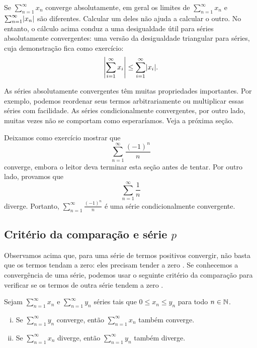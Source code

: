 Se $\sum_{n=1}^\infty x_n$ converge absolutamente, em geral os limites de
$\sum_{n=1}^\infty x_n$ e $\sum_{n=1}^\infty \lvert {x_n} \rvert$ são diferentes. Calcular um
deles não ajuda a calcular o outro. No entanto, o cálculo acima conduz a
uma desigualdade útil para séries absolutamente convergentes:
uma versão da desigualdade triangular para séries,
cuja demonstração fica como exercício:
\begin{equation*}
\left\lvert { \sum_{i=1}^\infty x_i } \right\rvert
\leq
\sum_{i=1}^\infty \lvert {x_i} \rvert .
\end{equation*}

As séries absolutamente convergentes têm muitas propriedades importantes.
Por exemplo, podemos reordenar seus termos arbitrariamente ou multiplicar essas
séries com facilidade. As séries condicionalmente convergentes,
por outro lado,
muitas vezes não se comportam como esperaríamos. Veja a próxima seção.

Deixamos como exercício mostrar que
\begin{equation*}
\sum_{n=1}^\infty \frac{{(-1)}^n}{n}
\end{equation*}
converge, embora o leitor deva terminar esta seção antes de tentar.
Por outro lado, provamos que
\begin{equation*}
\sum_{n=1}^\infty \frac{1}{n}
\end{equation*}
diverge. Portanto,
$\sum_{n=1}^\infty \frac{{(-1)}^n}{n}$ é uma série condicionalmente convergente.

\subsection{Critério da comparação e série \texorpdfstring{$p$}{p}}

Observamos acima que, para uma série de termos positivos convergir,
não basta que os termos tendam a zero: eles precisam tender a zero
. Se conhecemos a convergência de uma série,
podemos usar o seguinte critério da comparação para verificar se os termos de outra
série tendem a zero .

\begin{samepage}
\begin{prop}
Sejam $\sum_{n=1}^\infty x_n$ e $\sum_{n=1}^\infty y_n$ séries tais que $0 \leq x_n \leq y_n$
para todo $n \in {\mathbb{N}}$.
\begin{enumerate}[(i)]
\item Se $\sum_{n=1}^\infty y_n$ converge, então $\sum_{n=1}^\infty x_n$ também converge.
\item Se $\sum_{n=1}^\infty x_n$ diverge, então $\sum_{n=1}^\infty y_n$ também diverge.
\end{enumerate}
\end{prop}
\end{samepage}

